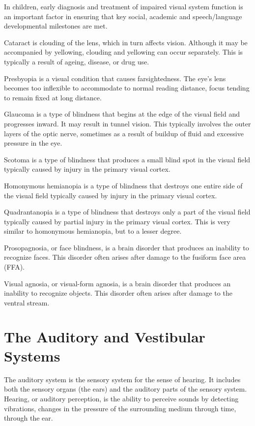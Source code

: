 \documentclass[]{book}
\begin{document}
In children, early diagnosis and treatment of impaired visual system function is an important factor in ensuring that key social, academic and speech/language developmental milestones are met.

Cataract is clouding of the lens, which in turn affects vision. Although it may be accompanied by yellowing, clouding and yellowing can occur separately. This is typically a result of ageing, disease, or drug use.

Presbyopia is a visual condition that causes farsightedness. The eye's lens becomes too inflexible to accommodate to normal reading distance, focus tending to remain fixed at long distance.

Glaucoma is a type of blindness that begins at the edge of the visual field and progresses inward. It may result in tunnel vision. This typically involves the outer layers of the optic nerve, sometimes as a result of buildup of fluid and excessive pressure in the eye.

Scotoma is a type of blindness that produces a small blind spot in the visual field typically caused by injury in the primary visual cortex.

Homonymous hemianopia is a type of blindness that destroys one entire side of the visual field typically caused by injury in the primary visual cortex.

Quadrantanopia is a type of blindness that destroys only a part of the visual field typically caused by partial injury in the primary visual cortex. This is very similar to homonymous hemianopia, but to a lesser degree.

Prosopagnosia, or face blindness, is a brain disorder that produces an inability to recognize faces. This disorder often arises after damage to the fusiform face area (FFA).

Visual agnosia, or visual-form agnosia, is a brain disorder that produces an inability to recognize objects. This disorder often arises after damage to the ventral stream.

\hypertarget{the-auditory-and-vestibular-systems}{%
\chapter{The Auditory and Vestibular Systems}\label{the-auditory-and-vestibular-systems}}

The auditory system is the sensory system for the sense of hearing. It includes both the sensory organs (the ears) and the auditory parts of the sensory system. Hearing, or auditory perception, is the ability to perceive sounds by detecting vibrations, changes in the pressure of the surrounding medium through time, through the ear.
\end{document}
